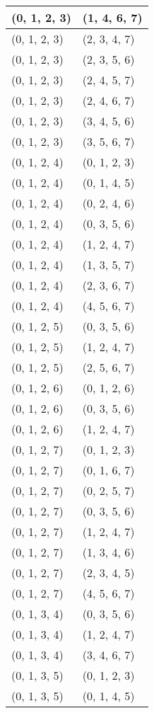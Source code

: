\begin{footnotesize}
\begin{longtable}[c]{|l|l|}
(0, 1, 2, 3)
&(1, 4, 6, 7)
\\ \hline
(0, 1, 2, 3)
&(2, 3, 4, 7)
\\ \hline
(0, 1, 2, 3)
&(2, 3, 5, 6)
\\ \hline
(0, 1, 2, 3)
&(2, 4, 5, 7)
\\ \hline
(0, 1, 2, 3)
&(2, 4, 6, 7)
\\ \hline
(0, 1, 2, 3)
&(3, 4, 5, 6)
\\ \hline
(0, 1, 2, 3)
&(3, 5, 6, 7)
\\ \hline
(0, 1, 2, 4)
&(0, 1, 2, 3)
\\ \hline
(0, 1, 2, 4)
&(0, 1, 4, 5)
\\ \hline
(0, 1, 2, 4)
&(0, 2, 4, 6)
\\ \hline
(0, 1, 2, 4)
&(0, 3, 5, 6)
\\ \hline
(0, 1, 2, 4)
&(1, 2, 4, 7)
\\ \hline
(0, 1, 2, 4)
&(1, 3, 5, 7)
\\ \hline
(0, 1, 2, 4)
&(2, 3, 6, 7)
\\ \hline
(0, 1, 2, 4)
&(4, 5, 6, 7)
\\ \hline
(0, 1, 2, 5)
&(0, 3, 5, 6)
\\ \hline
(0, 1, 2, 5)
&(1, 2, 4, 7)
\\ \hline
(0, 1, 2, 5)
&(2, 5, 6, 7)
\\ \hline
(0, 1, 2, 6)
&(0, 1, 2, 6)
\\ \hline
(0, 1, 2, 6)
&(0, 3, 5, 6)
\\ \hline
(0, 1, 2, 6)
&(1, 2, 4, 7)
\\ \hline
(0, 1, 2, 7)
&(0, 1, 2, 3)
\\ \hline
(0, 1, 2, 7)
&(0, 1, 6, 7)
\\ \hline
(0, 1, 2, 7)
&(0, 2, 5, 7)
\\ \hline
(0, 1, 2, 7)
&(0, 3, 5, 6)
\\ \hline
(0, 1, 2, 7)
&(1, 2, 4, 7)
\\ \hline
(0, 1, 2, 7)
&(1, 3, 4, 6)
\\ \hline
(0, 1, 2, 7)
&(2, 3, 4, 5)
\\ \hline
(0, 1, 2, 7)
&(4, 5, 6, 7)
\\ \hline
(0, 1, 3, 4)
&(0, 3, 5, 6)
\\ \hline
(0, 1, 3, 4)
&(1, 2, 4, 7)
\\ \hline
(0, 1, 3, 4)
&(3, 4, 6, 7)
\\ \hline
(0, 1, 3, 5)
&(0, 1, 2, 3)
\\ \hline
(0, 1, 3, 5)
&(0, 1, 4, 5)
\\ \hline

\end{longtable}
\end{footnotesize}
